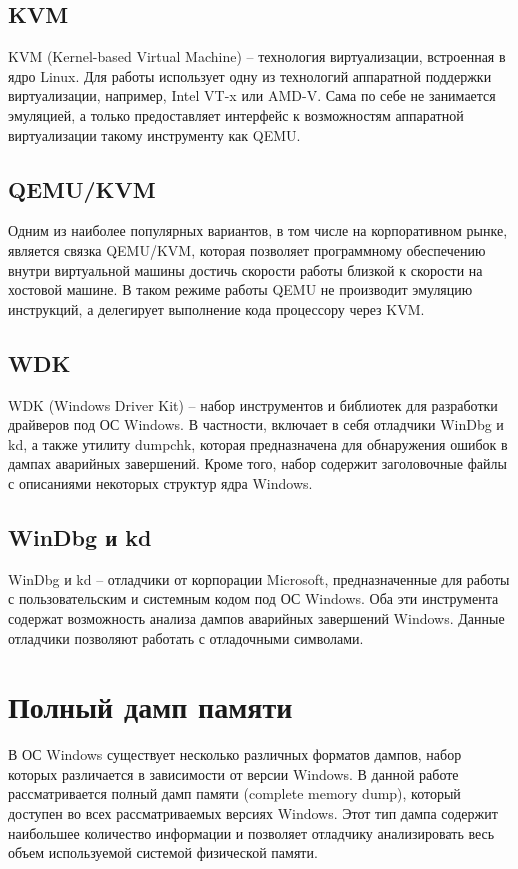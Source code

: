 \documentclass{mipt-thesis-bs}
\begin{document}
\section*{KVM}

KVM (Kernel-based Virtual Machine) -- технология виртуализации, встроенная в ядро Linux. Для работы использует одну из технологий аппаратной поддержки виртуализации, например, Intel VT-x или AMD-V. Сама по себе не занимается эмуляцией, а только предоставляет интерфейс к возможностям аппаратной виртуализации такому инструменту как QEMU.

\section*{QEMU/KVM}
Одним из наиболее популярных вариантов, в том числе на корпоративном рынке, является связка QEMU/KVM, которая позволяет программному обеспечению внутри виртуальной машины достичь скорости работы близкой к скорости на хостовой машине. В таком режиме работы QEMU не производит эмуляцию инструкций, а делегирует выполнение кода процессору через KVM.

\section*{WDK}

WDK (Windows Driver Kit) -- набор инструментов и библиотек для разработки драйверов под ОС Windows. В частности, включает в себя отладчики WinDbg и kd, а также утилиту dumpchk, которая предназначена для обнаружения ошибок в дампах аварийных завершений. Кроме того, набор содержит заголовочные файлы с описаниями некоторых структур ядра Windows.

\section*{WinDbg и kd}

WinDbg и kd -- отладчики от корпорации Microsoft, предназначенные для работы с пользовательским и системным кодом под ОС Windows. Оба эти инструмента содержат возможность анализа дампов аварийных завершений Windows. Данные отладчики позволяют работать с отладочными символами.

\chapter{Полный дамп памяти}

В ОС Windows существует несколько различных форматов дампов, набор которых различается в зависимости от версии Windows\cite{dumps}. В данной работе рассматривается полный дамп памяти (complete memory dump), который доступен во всех рассматриваемых версиях Windows. Этот тип дампа содержит наибольшее количество информации и позволяет отладчику анализировать весь объем используемой системой физической памяти\cite{completedump}.
\end{document}
